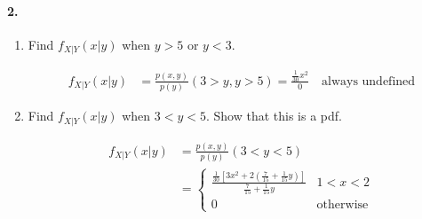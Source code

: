     \paragraph*{2.}
    \begin{enumerate}[label=(\alph*)]
        \item Find $f_{X|Y}(x|y)$ when $y > 5$ or $y < 3$.
        \\
        \begin{mdframed}
            \begin{align*}
                f_{X|Y}(x|y)    & = \frac{p(x,y)}{p(y)} (3 > y, y > 5) 
                                  = \frac{\frac{1}{30}x^{2}}{0} \quad \boxed{\text{always undefined}}
            \end{align*}
        \end{mdframed}

        \item Find $f_{X|Y}(x|y)$ when $3 < y < 5$. Show that this is a pdf.
        \\
        \begin{mdframed}
            \begin{align*}
                f_{X|Y}(x|y)    & = \frac{p(x,y)}{p(y)} (3 < y < 5)     \\
                                & = \begin{cases}
                                    \frac{\frac{1}{30}\left[3x^{2}+2\left(\frac{7}{15}+\frac{1}{15}y\right)\right]}{\frac{7}{15}+\frac{1}{15}y} & 1 < x < 2 \\
                                    0 & \text{otherwise}
                                \end{cases}
            \end{align*}
        \end{mdframed}


\end{enumerate}
